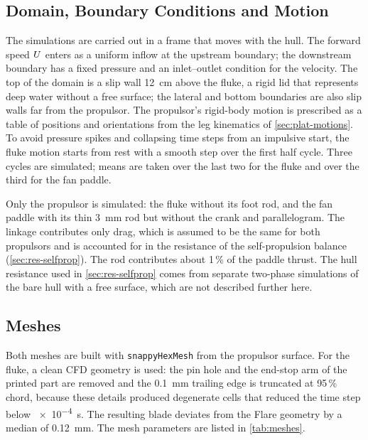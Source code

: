 \subsection{Domain, Boundary Conditions and Motion}

The simulations are carried out in a frame that moves with the hull. The forward speed $U$ enters as a uniform
inflow at the upstream boundary; the downstream boundary has a fixed pressure and an inlet--outlet condition for the velocity. The top
of the domain is a slip wall \SI{12}{\centi\metre} above the fluke, a rigid lid that represents deep water without
a free surface; the lateral and bottom boundaries are also slip walls far from the propulsor. The propulsor's
rigid-body motion is prescribed as a table of positions and orientations from the leg kinematics of
\cref{sec:plat-motions}. To avoid pressure spikes and collapsing time steps from an impulsive start, the fluke
motion starts from rest with a smooth step over the first half cycle. Three cycles are simulated; means are taken
over the last two for the fluke and over the third for the fan paddle.

Only the propulsor is simulated: the fluke without its foot rod, and the fan paddle with its thin
\SI{3}{\milli\metre} rod but without the crank and parallelogram. The linkage contributes only drag, which is assumed to be the same for both propulsors and is accounted for in the resistance of the self-propulsion balance
(\cref{sec:res-selfprop}). The rod contributes about 1\,\% of the paddle thrust. The hull resistance used in \cref{sec:res-selfprop} comes from separate two-phase simulations of the bare hull with a free surface, which are not described further here.

\subsection{Meshes}

Both meshes are built with \texttt{snappyHexMesh} from the propulsor surface. For the fluke, a clean CFD geometry
is used: the pin hole and the end-stop arm of the printed part are removed and the \SI{0.1}{\milli\metre}
trailing edge is truncated at 95\,\% chord, because these details produced degenerate cells that reduced the time
step below \SI{e-4}{\second}. The resulting blade deviates from the Flare geometry by a median of
\SI{0.12}{\milli\metre}. The mesh parameters are listed in \cref{tab:meshes}.

